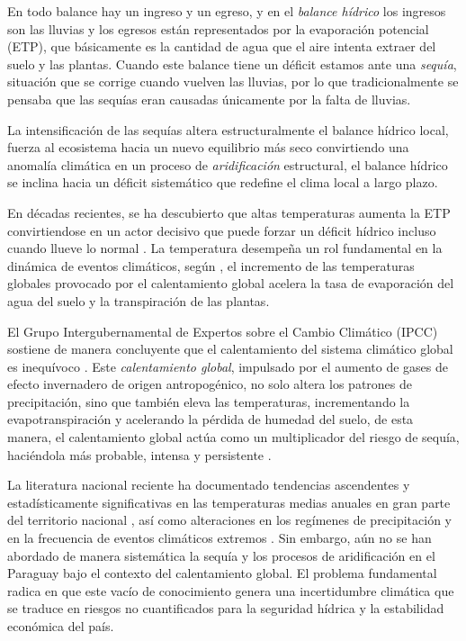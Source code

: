 \documentclass[11pt,a4paper]{article}
\begin{document}
En todo balance hay un ingreso y un egreso, y en el \textit{balance hídrico} los ingresos son las lluvias y los egresos están representados por la evaporación potencial (ETP), que básicamente es la cantidad de agua que el aire intenta extraer del suelo y las plantas. Cuando este balance tiene un déficit estamos ante una \textit{sequía}, situación que se corrige cuando vuelven las lluvias, por lo que tradicionalmente se pensaba que las sequías eran causadas únicamente por la falta de lluvias. 

La intensificación de las sequías altera estructuralmente el balance hídrico local, fuerza al ecosistema hacia un nuevo equilibrio más seco convirtiendo una anomalía climática en un proceso de \textit{aridificación} estructural, el balance hídrico se inclina hacia un déficit sistemático que redefine el clima local a largo plazo.

En décadas recientes, se ha descubierto que altas temperaturas aumenta la ETP convirtiendose en un actor decisivo que puede forzar un déficit hídrico incluso cuando llueve lo normal \citep{vicenteserrano2010}. La temperatura desempeña un rol fundamental en la dinámica de eventos climáticos, según \citet{massondelmotte2021}, el incremento de las temperaturas globales provocado por el calentamiento global acelera la tasa de evaporación del agua del suelo y la transpiración de las plantas.

El Grupo Intergubernamental de Expertos sobre el Cambio Climático (IPCC) sostiene de manera concluyente que el calentamiento del sistema climático global es inequívoco \citep{stocker_climate_2013}. Este \textit{calentamiento global}, impulsado por el aumento de gases de efecto invernadero de origen antropogénico, no solo altera los patrones de precipitación, sino que también eleva las temperaturas, incrementando la evapotranspiración y acelerando la pérdida de humedad del suelo, de esta manera, el calentamiento global actúa como un multiplicador del riesgo de sequía, haciéndola más probable, intensa y persistente \citep{massondelmotte2021}.

La literatura nacional reciente ha documentado tendencias ascendentes y estadísticamente significativas en las temperaturas medias anuales en gran parte del territorio nacional \citep{chavez2023}, así como alteraciones en los regímenes de precipitación y en la frecuencia de eventos climáticos extremos \citep{chavez2023, grassi2020}. Sin embargo, aún no se han abordado de manera sistemática la sequía y los procesos de aridificación en el Paraguay bajo el contexto del calentamiento global. El problema fundamental radica en que este vacío de conocimiento genera una incertidumbre climática que se traduce en riesgos no cuantificados para la seguridad hídrica y la estabilidad económica del país.
\end{document}
